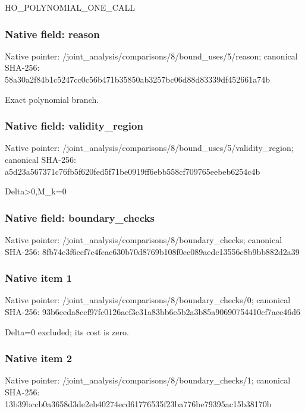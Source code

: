 \documentclass[10pt,a4paper]{article}
\begin{document}
\begingroup\raggedright\sloppy HO\_\allowbreak{}POLYNOMIAL\_\allowbreak{}ONE\_\allowbreak{}CALL\par\endgroup

\subsubsection{Native field: reason}
Native pointer: /joint\_\allowbreak{}analysis/comparisons/8/bound\_\allowbreak{}uses/5/reason; canonical SHA-256: 58a30a2f84b1c5247cc0c56b471b35850ab3257bc06d88d83339df452661a74b

\begingroup\raggedright\sloppy Exact polynomial branch.\par\endgroup

\subsubsection{Native field: validity\_\allowbreak{}region}
Native pointer: /joint\_\allowbreak{}analysis/comparisons/8/bound\_\allowbreak{}uses/5/validity\_\allowbreak{}region; canonical SHA-256: a5d23a567371c76fb5f620fed5f71be0919ff6ebb558cf709765eebeb6254c4b

\begingroup\raggedright\sloppy Delta>0,\allowbreak{}M\_\allowbreak{}k=\allowbreak{}0\par\endgroup

\subsubsection{Native field: boundary\_\allowbreak{}checks}
Native pointer: /joint\_\allowbreak{}analysis/comparisons/8/boundary\_\allowbreak{}checks; canonical SHA-256: 8fb74c3f6ccf7c4feac630b70d8769b108f0cc089aedc13556c8b9bb882d2a39

\subsubsection{Native item 1}
Native pointer: /joint\_\allowbreak{}analysis/comparisons/8/boundary\_\allowbreak{}checks/0; canonical SHA-256: 93b6eeda8ccf97fc0126aef3c31a83bb6e5b2a3b85a90690754410cf7aee46d6

\begingroup\raggedright\sloppy Delta=\allowbreak{}0 excluded;\allowbreak{} its cost is zero.\par\endgroup

\subsubsection{Native item 2}
Native pointer: /joint\_\allowbreak{}analysis/comparisons/8/boundary\_\allowbreak{}checks/1; canonical SHA-256: 13b39bccb0a3658d3de2eb40274ecd61776535f23ba776be79395ac15b38170b
\end{document}
